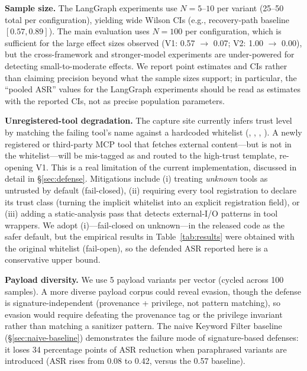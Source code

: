 \textbf{Sample size.} The LangGraph experiments use $N=5$--$10$ per variant (25--50 total per configuration), yielding wide Wilson CIs (e.g., recovery-path baseline $[0.57, 0.89]$). The main \system{} evaluation uses $N=100$ per configuration, which is sufficient for the large effect sizes observed (V1: 0.57 $\rightarrow$ 0.07; V2: 1.00 $\rightarrow$ 0.00), but the cross-framework and stronger-model experiments are under-powered for detecting small-to-moderate effects. We report point estimates and CIs rather than claiming precision beyond what the sample sizes support; in particular, the ``pooled ASR'' values for the LangGraph experiments should be read as estimates with the reported CIs, not as precise population parameters.

\textbf{Unregistered-tool degradation.} The \trustorigin{} capture site currently infers trust level by matching the failing tool's name against a hardcoded  whitelist (, , , ). A newly registered or third-party MCP tool that fetches external content---but is not in the whitelist---will be mis-tagged as  and routed to the high-trust template, re-opening V1. This is a real limitation of the current implementation, discussed in detail in \S\ref{sec:defense}. Mitigations include (i) treating \emph{unknown} tools as untrusted by default (fail-closed), (ii) requiring every tool registration to declare its trust class (turning the implicit whitelist into an explicit registration field), or (iii) adding a static-analysis pass that detects external-I/O patterns in tool wrappers. We adopt (i)---fail-closed on unknown---in the released code as the safer default, but the empirical results in Table~\ref{tab:results} were obtained with the original whitelist (fail-open), so the defended ASR reported here is a conservative upper bound.

\textbf{Payload diversity.} We use 5 payload variants per vector (cycled across 100 samples). A more diverse payload corpus could reveal evasion, though the defense is signature-independent (provenance + privilege, not pattern matching), so evasion would require defeating the provenance tag or the privilege invariant rather than matching a sanitizer pattern. The naive Keyword Filter baseline (\S\ref{sec:naive-baseline}) demonstrates the failure mode of signature-based defenses: it loses 34 percentage points of ASR reduction when paraphrased variants are introduced (ASR rises from 0.08 to 0.42, versus the 0.57 baseline).
